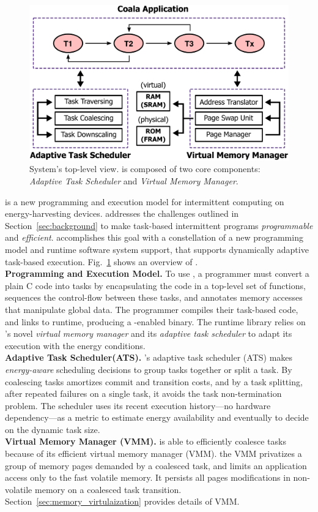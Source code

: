 \begin{figure}
	\centering
	\includegraphics[width=\columnwidth]{figures/overview.pdf}
	\caption{System's top-level view. \sys is composed of two core components: \emph{Adaptive Task Scheduler} and \emph{Virtual Memory Manager}.}
	\label{fig:system_overview}
\end{figure}
%
\sys is a new programming and execution model for intermittent computing on energy-harvesting devices. \sys addresses the challenges outlined in Section~\ref{sec:background} to make task-based intermittent programs {\em programmable} and {\em efficient}. \sys accomplishes this goal with a constellation of a new programming model and runtime software system support, that supports dynamically adaptive task-based execution. Fig.~\ref{fig:system_overview} shows an overview of \sys.\\
%
\textbf{Programming and Execution Model.}  To use \sys, a programmer must convert a plain C code into tasks by encapsulating the code in a top-level set of functions, sequences the control-flow between these tasks, and annotates memory accesses that manipulate global data.
The programmer compiles their task-based code, and links to \sys runtime,
producing a \sys-enabled binary. The runtime library relies on \sys's novel
{\em virtual memory manager} and its {\em adaptive task scheduler} to adapt its execution with the energy conditions.\\
%
\textbf{Adaptive Task Scheduler(ATS).} 
\sys's adaptive task scheduler (ATS) makes \emph{energy-aware} scheduling decisions to group tasks together or split a task. By coalescing tasks \sys amortizes commit and transition costs, and by a task splitting, after repeated failures on a single task, it avoids the task non-termination problem. The scheduler uses its recent execution history---no hardware dependency---as a metric to estimate energy availability and eventually to decide on the dynamic task size. \\
%
\textbf{Virtual Memory Manager (VMM).} \sys is able to efficiently coalesce
tasks because of its efficient virtual memory manager (VMM).
the VMM privatizes a group of memory pages demanded by a coalesced task, and limits an application access only to the fast volatile memory. It persists all pages modifications in non-volatile memory on a coalesced task transition. Section~\ref{sec:memory_virtulaization} provides details of VMM.
